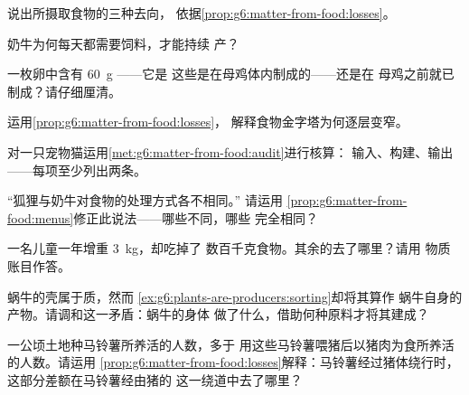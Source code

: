 \begin{exercise}[$\star$]\label{exo:g6:matter-from-food:4}
说出所摄取食物的三种去向，
依据\cref{prop:g6:matter-from-food:losses}。
\end{exercise}

\begin{exercise}[$\star$]\label{exo:g6:matter-from-food:5}
奶牛为何每天都需要饲料，才能持续
产？
\end{exercise}

\begin{exercise}[$\star$]\label{exo:g6:matter-from-food:6}
一枚卵中含有 \qty{60}{g} ——它是
这些是在母鸡体内制成的——还是在
母鸡之前就已制成？请仔细厘清。
\end{exercise}

\begin{exercise}[$\star\star$]\label{exo:g6:matter-from-food:7}
运用\cref{prop:g6:matter-from-food:losses}，
解释食物金字塔为何逐层变窄。
\end{exercise}

\begin{exercise}[$\star\star$]\label{exo:g6:matter-from-food:8}
对一只宠物猫运用\cref{met:g6:matter-from-food:audit}进行核算：
输入、构建、输出——每项至少列出两条。
\end{exercise}

\begin{exercise}[$\star\star$]\label{exo:g6:matter-from-food:9}
“狐狸与奶牛对食物的处理方式各不相同。”
请运用
\cref{prop:g6:matter-from-food:menus}修正此说法——哪些不同，哪些
完全相同？
\end{exercise}

\begin{exercise}[$\star\star$]\label{exo:g6:matter-from-food:10}
一名儿童一年增重 \qty{3}{kg}，却吃掉了
数百千克食物。其余的去了哪里？请用
物质账目作答。
\end{exercise}

\begin{exercise}[$\star\star$]\label{exo:g6:matter-from-food:11}
蜗牛的壳属于质，然而
\cref{ex:g6:plants-are-producers:sorting}却将其算作
蜗牛自身的产物。请调和这一矛盾：蜗牛的身体
做了什么，借助何种原料才将其建成？
\end{exercise}

\begin{exercise}[$\star\star\star$]\label{exo:g6:matter-from-food:12}
一公顷土地种马铃薯所养活的人数，多于
用这些马铃薯喂猪后以猪肉为食所养活的人数。请运用
\cref{prop:g6:matter-from-food:losses}解释：马铃薯经过猪体绕行时，
这部分差额在马铃薯经由猪的
这一绕道中去了哪里？
\end{exercise}

